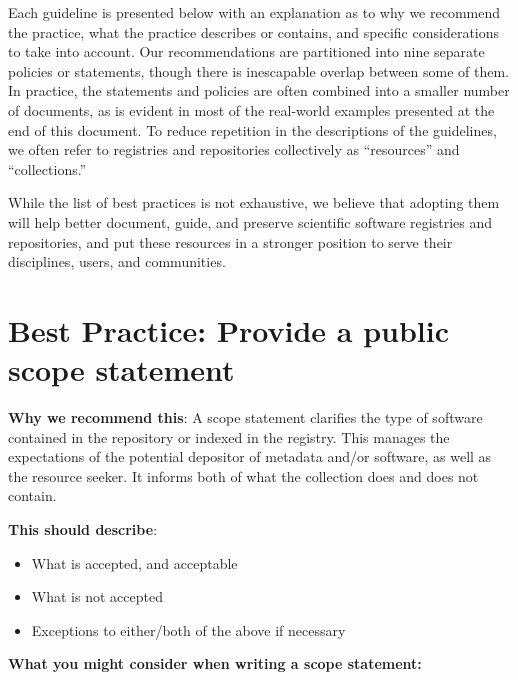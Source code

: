 \documentclass[11pt]{article}
\begin{document}
Each guideline is presented below with an explanation as to why we recommend the practice, what the practice describes or contains, and specific considerations to take into account.  Our recommendations are partitioned into nine separate policies or statements, though there is inescapable overlap between some of them. In practice, the statements and policies are often combined into a smaller number of documents, as is evident in most of the real-world examples presented at the end of this document. To reduce repetition in the descriptions of the guidelines, we often refer to registries and repositories collectively as ``resources'' and ``collections.''  

While the list of best practices is not exhaustive, we believe that adopting them will help better document, guide, and preserve scientific software registries and repositories, and put these resources in a stronger position to serve their disciplines, users, and communities.


\section{Best Practice: Provide a public scope statement}
\label{best-practice-provide-a-public-scope-statement}

\textbf{Why we recommend this}: A scope statement clarifies the type of software contained in the repository or indexed in the registry. This manages the expectations of the potential depositor of metadata and/or software, as well as the resource seeker. It informs both of what the collection does and does not contain.

\textbf{This should describe}:

\begin{itemize}
\item What is accepted, and acceptable

\item What is not accepted

\item Exceptions to either/both of the above if necessary

\end{itemize}

\textbf{What you might consider when writing a scope statement: }
\end{document}
